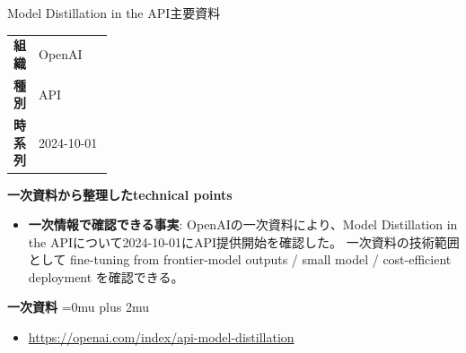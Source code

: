 \begin{technicalnote}{Model Distillation in the API}{主要資料}
\begingroup
\begin{tabularx}{\linewidth}{@{}>{\bfseries}p{0.22\linewidth}X@{}}
組織 & OpenAI \\
種別 & API \\
時系列 & 2024-10-01 \\
\end{tabularx}
\smallskip
{\bfseries 一次資料から整理したtechnical points}
\begin{itemize}[leftmargin=1.5em,itemsep=0.35em]
\item \textbf{一次情報で確認できる事実}: OpenAIの一次資料により、Model Distillation in the APIについて2024-10-01にAPI提供開始を確認した。 一次資料の技術範囲として fine-tuning from frontier-model outputs / small model / cost-efficient deployment を確認できる。
\end{itemize}
\begin{minipage}{\linewidth}
\begin{samepage}
{\bfseries 一次資料}
\begingroup\sloppy
\Urlmuskip=0mu plus 2mu\relax
\begin{itemize}[leftmargin=1.5em,itemsep=0.25em]
\item {\scriptsize\url{https://openai.com/index/api-model-distillation}}
\end{itemize}
\endgroup
\end{samepage}
\end{minipage}
\endgroup
\end{technicalnote}
\medskip

